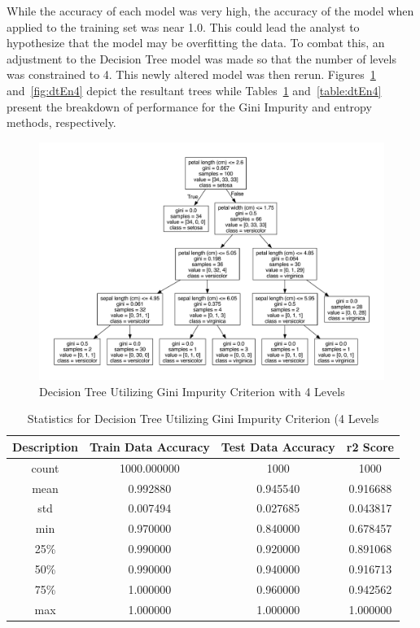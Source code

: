 \documentclass[journal]{IEEEtran}
\begin{document}
While the accuracy of each model was very high, the accuracy of the model when applied to the training set was near 1.0. This could lead the analyst to hypothesize that the model may be overfitting the data. To combat this, an adjustment to the Decision Tree model was made so that the number of levels was constrained to 4. This newly altered model was then rerun. Figures~\ref{fig:dtGI4} and~\ref{fig:dtEn4} depict the resultant trees while Tables~\ref{table:dtGI4} and~\ref{table:dtEn4} present the breakdown of performance for the Gini Impurity and entropy methods, respectively. 

\begin{figure}[h!]
\includegraphics[scale=0.25]{iris-gini-4levels.pdf}
\centering
\caption{Decision Tree Utilizing Gini Impurity Criterion with 4 Levels}
\label{fig:dtGI4}
\end{figure}

\newpage


\begin{table}[h!]
\centering
\begin{tabular}{ c | c c c }
    Description & Train Data Accuracy & Test Data Accuracy & r2 Score \\ 
\hline
count     &     1000.000000     &    1000 & 1000\\
mean      &        0.992880     &       0.945540  &   0.916688\\
std       &        0.007494     &       0.027685  &   0.043817\\
min       &        0.970000     &       0.840000  &   0.678457\\
25\%      &         0.990000    &        0.920000 &    0.891068\\
50\%      &         0.990000    &        0.940000 &    0.916713\\
75\%      &         1.000000    &        0.960000 &    0.942562\\
max       &        1.000000     &       1.000000  &   1.000000
\end{tabular}
\caption{Statistics for Decision Tree Utilizing Gini Impurity Criterion (4 Levels}
\label{table:dtGI4}
\end{table}
\end{document}
